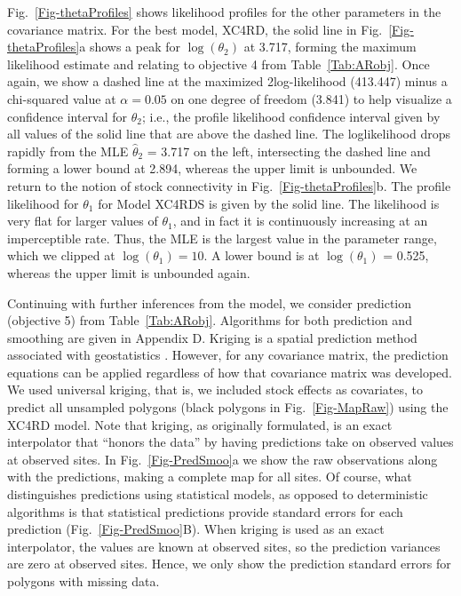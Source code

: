 \documentclass[11pt, titlepage]{article}\usepackage[]{graphicx}\usepackage[]{color}
\begin{document}
Fig.~\ref{Fig-thetaProfiles} shows likelihood profiles for the other parameters in the covariance matrix.  For the best model, XC4RD, the solid line in Fig.~\ref{Fig-thetaProfiles}a shows a peak for $\log(\theta_2)$ at 3.717, forming the maximum likelihood estimate and relating to objective 4 from Table~\ref{Tab:ARobj}. Once again, we show a dashed line at the maximized 2log-likelihood (413.447) minus a chi-squared value at $\alpha = 0.05$ on one degree of freedom (3.841) to help visualize a confidence interval for $\theta_2$; i.e., the profile likelihood confidence interval given by all values of the solid line that are above the dashed line. The loglikelihood drops rapidly from the MLE $\hat{\theta}_2$ = 3.717 on the left, intersecting the dashed line and forming a lower bound at 2.894, whereas the upper limit is unbounded. We return to the notion of stock connectivity in Fig.~\ref{Fig-thetaProfiles}b.  The profile likelihood for $\theta_1$ for Model XC4RDS is given by the solid line. The likelihood is very flat for larger values of $\theta_1$, and in fact it is continuously increasing at an imperceptible rate. Thus, the MLE is the largest value in the parameter range, which we clipped at $\log(\theta_1) = 10$. A lower bound is at $\log(\theta_1)$ = 0.525, whereas the upper limit is unbounded again.

Continuing with further inferences from the model, we consider prediction (objective 5) from Table~\ref{Tab:ARobj}. Algorithms for both prediction and smoothing are given in Appendix D.  Kriging is a spatial prediction method associated with geostatistics \citep{Cres:orig:1990}.  However, for any covariance matrix, the prediction equations can be applied regardless of how that covariance matrix was developed.  We used universal kriging, that is, we included stock effects as covariates, \citep[][pg. 151]{Huij:Math:univ:1971,Cres:stat:1993} to predict all unsampled polygons (black polygons in Fig.~\ref{Fig-MapRaw}) using the XC4RD model. Note that kriging, as originally formulated, is an exact interpolator \citep[pg. 129]{Cres:stat:1993} that ``honors the data'' \citep[p. 252]{Scha:Gotw:stat:2005} by having predictions take on observed values at observed sites.  In Fig.~\ref{Fig-PredSmoo}a we show the raw observations along with the predictions, making a complete map for all sites. Of course, what distinguishes predictions using statistical models, as opposed to deterministic algorithms \citep[e.g., inverse distance weighted,][]{Shep:two:1968} is that statistical predictions provide standard errors for each prediction (Fig.~\ref{Fig-PredSmoo}B).  When kriging is used as an exact interpolator, the values are known at observed sites, so the prediction variances are zero at observed sites.  Hence, we only show the prediction standard errors for polygons with missing data.  
\end{document}
